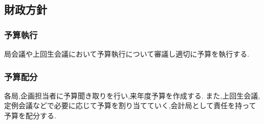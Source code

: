 \subsection*{財政方針}


\subsubsection*{予算執行}
局会議や上回生会議において予算執行について審議し適切に予算を執行する.
\subsubsection*{予算配分}
各局,企画担当者に予算聞き取りを行い,来年度予算を作成する. また,上回生会議,定例会議などで必要に応じて予算を割り当てていく,会計局として責任を持って予算を配分する.

